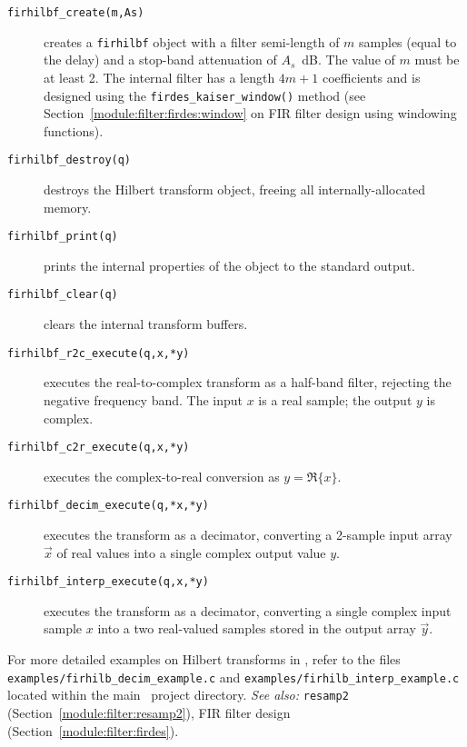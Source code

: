 \begin{description}
\item[{\tt firhilbf\_create(m,As)}]
    creates a {\tt firhilbf} object with a filter semi-length of $m$
    samples (equal to the delay)
    and a stop-band attenuation of $A_s$~dB.
    The value of $m$ must be at least 2.
    The internal filter has a length $4m+1$ coefficients and is designed
    using the {\tt firdes\_kaiser\_window()} method
    (see Section~\ref{module:filter:firdes:window} on FIR filter design
    using windowing functions).
\item[{\tt firhilbf\_destroy(q)}]
    destroys the Hilbert transform object, freeing all
    internally-allocated memory.
\item[{\tt firhilbf\_print(q)}]
    prints the internal properties of the object to the standard
    output.
\item[{\tt firhilbf\_clear(q)}]
    clears the internal transform buffers.
\item[{\tt firhilbf\_r2c\_execute(q,x,*y)}]
    executes the real-to-complex transform as a half-band filter,
    rejecting the negative frequency band.
    The input $x$ is a real sample;
    the output $y$ is complex.
\item[{\tt firhilbf\_c2r\_execute(q,x,*y)}]
    executes the complex-to-real conversion as $y = \Re\{x\}$.
\item[{\tt firhilbf\_decim\_execute(q,*x,*y)}]
    executes the transform as a decimator, converting a 2-sample input
    array $\vec{x}$ of real values into a single complex output value
    $y$.
\item[{\tt firhilbf\_interp\_execute(q,x,*y)}]
    executes the transform as a decimator, converting a single complex
    input sample $x$ into a two real-valued samples stored in the output
    array $\vec{y}$.
\end{description}
%
For more detailed examples on Hilbert transforms in \liquid,
refer to the files
{\tt examples/firhilb\_decim\_example.c} and
{\tt examples/firhilb\_interp\_example.c}
located within the main \liquid\ project directory.
%
{\it See also:} {\tt resamp2} (Section~\ref{module:filter:resamp2}),
FIR filter design (Section~\ref{module:filter:firdes}).


% 
%
